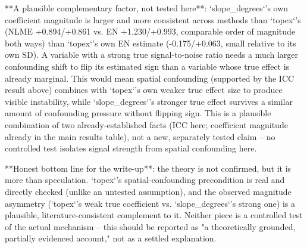 **A plausible complementary factor, not tested here**: `slope_degrees`'s own coefficient magnitude
is larger and more consistent across methods than `topex`'s (NLME +0.894/+0.861 vs. EN
+1.230/+0.993, comparable order of magnitude both ways) than `topex`'s own EN estimate
(-0.175/+0.063, small relative to its own SD). A variable with a strong true signal-to-noise
ratio needs a much larger confounding shift to flip its estimated sign than a variable whose true
effect is already marginal. This would mean spatial confounding (supported by the ICC result
above) combines with `topex`'s own weaker true effect size to produce visible instability, while
`slope_degrees`'s stronger true effect survives a similar amount of confounding pressure without
flipping sign. This is a plausible combination of two already-established facts (ICC here;
coefficient magnitude already in the main results table), not a new, separately tested claim --
no controlled test isolates signal strength from spatial confounding here.

**Honest bottom line for the write-up**: the theory is not confirmed, but it is more than
speculation. `topex`'s spatial-confounding precondition is real and directly checked (unlike an
untested assumption), and the observed magnitude asymmetry (`topex`'s weak true coefficient vs.
`slope_degrees`'s strong one) is a plausible, literature-consistent complement to it. Neither
piece is a controlled test of the actual mechanism -- this should be reported as "a
theoretically grounded, partially evidenced account," not as a settled explanation.
